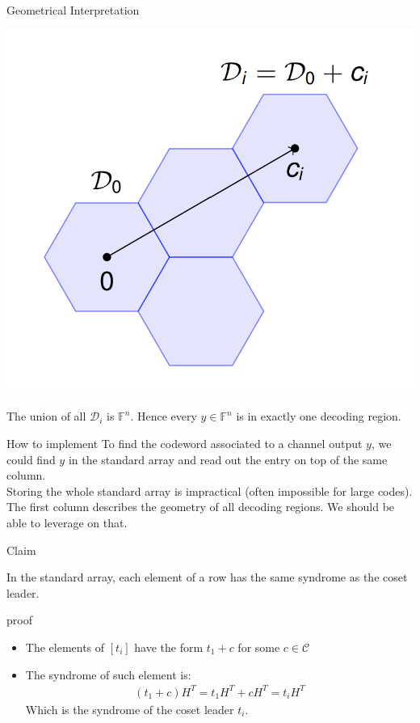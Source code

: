 \begin{parag}{Geometrical Interpretation}
    \begin{center}
        \includegraphics[scale=0.5]{12025-05-20.png}
    \end{center}
    The union of all $\mathcal{D}_i$ is $\mathbb{F}^n$. Hence every $y \in \mathbb{F}^n$ is in exactly one decoding region.
\end{parag}
\begin{parag}{How to implement}
    To find the codeword associated to a channel output $y$, we could find $y$ in the standard array and read out the entry on top of the same column.\\
    Storing the whole standard array is impractical (often impossible for large codes).\\
    The first column describes the geometry of all decoding regions. We should be able to leverage on that.
\end{parag}
\begin{parag}{Claim}
    \begin{theoreme}
    In the standard array, each element of a row has the same syndrome as the coset leader.
    \end{theoreme}
    \begin{subparag}{proof}
        \begin{itemize}
		\item The elements of $\left[t_i\right]$ have the form $t_1 + c$ for some $c \in \mathcal{C}$
		\item The syndrome of such element is:
			\begin{align*} 
				(t_1 + c)H^T =  t_1H^T + cH^T =  t_iH^T
			\end{align*}
			Which is the syndrome of the coset leader $t_i$.
        \end{itemize}
    \end{subparag}
\end{parag}
